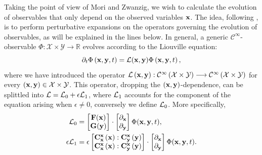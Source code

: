 \documentclass[12pt]{article}
\begin{document}
Taking the point of view of Mori and Zwanzig, we wish to calculate the evolution of observables that only depend on the observed variables $\mathbf{x}$. The idea, following \cite{wouters2013}, is to perform perturbative expansions on the operators governing the evolution of observables, as will be explained in the lines below. In general, a generic $\mathcal{C}^{\infty}$-observable $\Phi : \mathcal{X}\times \mathcal{Y} \longrightarrow \mathbb{R}$ evolves according to the Liouville equation:
\begin{equation}\label{liouville equation}
	\partial _t \Phi \left( \mathbf{x} , \mathbf{y} , t \right) = \mathcal{L} (\mathbf{x} ,\mathbf{y})\Phi \left( \mathbf{x} , \mathbf{y} , t \right),
\end{equation}
where we have introduced the operator $\mathcal{L}\left(\mathbf{x} , \mathbf{y}\right) : \mathcal{C} ^{\infty}\left( \mathcal{X}\times \mathcal{Y} \right)\longrightarrow \mathcal{C} ^{\infty}\left( \mathcal{X}\times \mathcal{Y} \right)$ for every $(\mathbf{x} , \mathbf{y})\in \mathcal{X}\times \mathcal{Y}$. This operator, dropping the $(\mathbf{x},\mathbf{y})$-dependence, can be splittled into $\mathcal{L} = \mathcal{L}_0 +\epsilon \mathcal{L}_1$, where $\mathcal{L}_1$ accounts for the component of the equation arising when $\epsilon \neq 0$, conversely we define $\mathcal{L}_0$. More specifically,
\begin{align}
	\mathcal{L}_0 &= \begin{bmatrix}
	\mathbf{F} (\mathbf{x}) \\ \mathbf{G} (\mathbf{y})
	\end{bmatrix}\cdot \begin{bmatrix}
	\partial_{\mathbf{x}} \\ \partial_{\mathbf{y}}
	\end{bmatrix}\Phi (\mathbf{x}, \mathbf{y} , t), \\
		\epsilon \mathcal{L}_1 &= \epsilon \begin{bmatrix}
	 \mathbf{C}_{\mathbf{x}}^{\mathbf{x}}\left(\mathbf{x} \right) : \mathbf{C}_{\mathbf{y}}^{\mathbf{x}}\left(\mathbf{y} \right) \\ \mathbf{C}_{\mathbf{x}}^{\mathbf{x}}\left(\mathbf{x} \right) : \mathbf{C}_{\mathbf{y}}^{\mathbf{x}}\left(\mathbf{y} \right)
	\end{bmatrix}\cdot \begin{bmatrix}
	\partial_{\mathbf{x}} \\ \partial_{\mathbf{y}}
	\end{bmatrix} \Phi (\mathbf{x}, \mathbf{y} , t).
\end{align}
\end{document}
